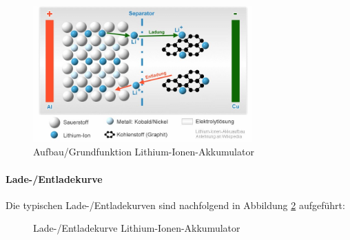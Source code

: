 \begin{figure}[h!]
	\centering
\includegraphics[width=0.75\textwidth]{images/aufbau_liion.jpg}
	\caption{Aufbau/Grundfunktion Lithium-Ionen-Akkumulator \cite{liion_akku_aufbau_funktion1}}
	\label{fig:liion_akku}
\end{figure}

\newpage

\paragraph{Lade-/Entladekurve}

Die typischen Lade-/Entladekurven sind nachfolgend in Abbildung \ref{fig:liion_akku_kurve} aufgeführt:

\begin{figure}[h!]
\caption{Lade-/Entladekurve Lithium-Ionen-Akkumulator}
\label{fig:liion_akku_kurve}
\end{figure}

